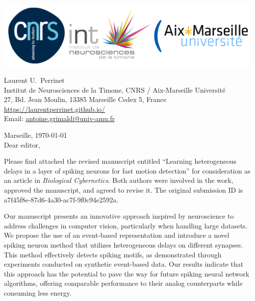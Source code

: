 \documentclass[10pt,english]{article}
\makeatletter
\newcommand{\LastName}{Perrinet}%
\newcommand{\FirstName}{Laurent U.}%
\newcommand{\Institute}{Institut de Neurosciences de la Timone, CNRS / Aix-Marseille Universit\'e}%
\newcommand{\Address}{27, Bd. Jean Moulin, 13385 Marseille Cedex 5, France}%
\newcommand{\Website}{\url{https://laurentperrinet.github.io/}}%
\newcommand{\Email}{\url{antoine.grimaldi@univ-amu.fr}}%
\makeatother
\begin{document}
\includegraphics[width=.4\textwidth]{troislogos.png}
\\
\vspace{.1\baselineskip}
\hrulefill
\vspace{.1\baselineskip}

\begin{flushright}
	\FirstName\  \LastName\  \\
	\Institute\\[6pt]
	\Address\\%
	\Website \\
	  Email: \Email \\[6pt]
\end{flushright}
\justifying
\vspace{1\baselineskip}
Marseille, 
\today
\\[12pt] %
	
Dear editor,

Please find attached the revised manuscript entitled ``Learning heterogeneous delays in a layer of spiking neurons for fast motion detection'' for consideration as an article in \emph{Biological Cybernetics}. Both authors were involved in the work, approved the manuscript, and agreed to revise it. The original submission ID is a7f45f8e-87d6-4a30-ac7f-9f0c94e2592a. 

Our manuscript presents an innovative approach inspired by neuroscience to address challenges in computer vision, particularly when handling large datasets. We propose the use of an event-based representation and introduce a novel spiking neuron method that utilizes heterogeneous delays on different synapses. This method effectively detects spiking motifs, as demonstrated through experiments conducted on synthetic event-based data. Our results indicate that this approach has the potential to pave the way for future spiking neural network algorithms, offering comparable performance to their analog counterparts while consuming less energy.
\end{document}
